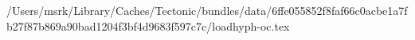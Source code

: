 /Users/msrk/Library/Caches/Tectonic/bundles/data/6ffe055852f8faf66c0acbe1a7fb27f87b869a90bad1204f3bf4d9683f597c7c/loadhyph-oc.tex